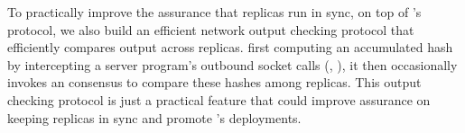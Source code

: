 To practically improve the assurance that replicas run in sync, on top of 
\xxx's \paxos protocol, we also build an efficient network output checking 
protocol that efficiently compares output across replicas. first computing an 
accumulated hash by intercepting a server program's outbound socket calls (\eg, 
\send), it then occasionally invokes an consensus to compare these hashes among 
replicas. This output checking protocol is just a practical feature that could 
improve assurance on keeping replicas in sync and promote \xxx's deployments. 




% 



